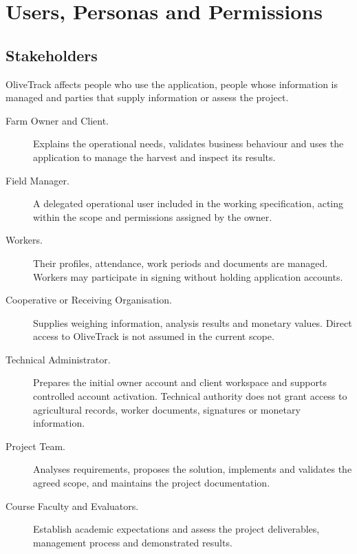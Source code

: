 \section{Users, Personas and Permissions}
\label{sec:users}

\subsection{Stakeholders}

OliveTrack affects people who use the application,
people whose information is managed
and parties that supply information
or assess the project.

\begin{description}

    \item[Farm Owner and Client.]
    Explains the operational needs,
    validates business behaviour
    and uses the application to manage
    the harvest and inspect its results.

    \item[Field Manager.]
    A delegated operational user included in the working specification, acting within the scope and permissions assigned by the owner.

    \item[Workers.]
    Their profiles, attendance,
    work periods and documents are managed.
    Workers may participate in signing
    without holding application accounts.

    \item[Cooperative or Receiving Organisation.]
    Supplies weighing information,
    analysis results and monetary values.
    Direct access to OliveTrack
    is not assumed in the current scope.

    \item[Technical Administrator.]
    Prepares the initial owner account and client workspace and supports controlled
    account activation. Technical authority does not grant access to agricultural
    records, worker documents, signatures or monetary information.

    \item[Project Team.]
    Analyses requirements, proposes the solution,
    implements and validates the agreed scope,
    and maintains the project documentation.

    \item[Course Faculty and Evaluators.]
    Establish academic expectations
    and assess the project deliverables,
    management process and demonstrated results.

\end{description}

